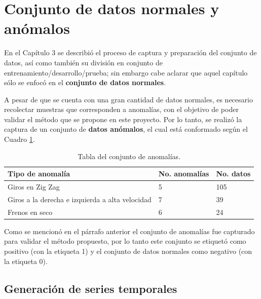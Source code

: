 \section{Conjunto de datos normales y an\'{o}malos}

En el Cap\'{i}tulo 3 se describi\'{o} el proceso de captura y preparaci\'{o}n del conjunto de datos, as\'{i} como tambi\'{e}n su divisi\'{o}n en conjunto de entrenamiento/desarrollo/prueba; sin embargo cabe aclarar que aquel cap\'{i}tulo s\'{o}lo se enfoc\'{o} en el \textbf{conjunto de datos normales}.%

\vspace{5mm} %

A pesar de que se cuenta con una gran cantidad de datos normales, es necesario recolectar muestras que corresponden a anomal\'{i}as, con el objetivo de poder validar el m\'{e}todo que se propone en este proyecto. Por lo tanto, se realiz\'{o} la captura de un conjunto de \textbf{datos an\'{o}malos}, el cual est\'{a} conformado seg\'{u}n el Cuadro \ref{table:conjunto_anomalias}.

\begin{table}[H]
\centering
\begin{tabular}{|l|l|l|}
\hline
\textbf{Tipo de anomal\'{i}a} & \textbf{No. anomal\'{i}as} & \textbf{No. datos} \\ \hline
Giros en Zig Zag & 5 & 105  \\ \hline
Giros a la derecha e izquierda a alta velocidad & 7 & 39  \\ \hline
Frenos en seco & 6 & 24 \\ \hline
\end{tabular}
\caption{Tabla del conjunto de anomal\'{i}as.}
\label{table:conjunto_anomalias}
\end{table}

\vspace{5mm} %

Como se mencion\'{o} en el p\'{a}rrafo anterior el conjunto de anomal\'{i}as fue capturado para validar el m\'{e}todo propuesto, por lo tanto este conjunto se etiquet\'{o} como positivo (con la etiqueta 1) y el conjunto de datos normales como negativo (con la etiqueta 0).

\subsection{Generaci\'{o}n de series temporales}

